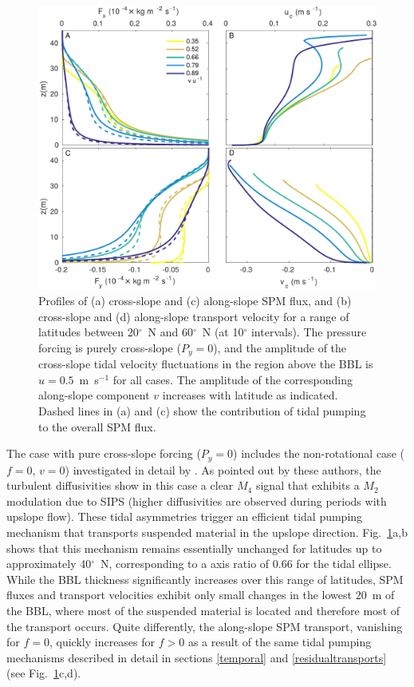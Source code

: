 \begin{figure}
  \noindent\includegraphics[width=30pc]{coriolis.pdf}
  \caption{Profiles of (a) cross-slope and (c) along-slope SPM flux,
    and (b) cross-slope and (d) along-slope transport velocity for a
    range of latitudes between 20$^\circ$~N and 60$^\circ$~N (at
    10$^\circ$ intervals).  The pressure forcing is purely cross-slope
    ($P_y=0$), and the amplitude of the cross-slope tidal velocity
    fluctuations in the region above the BBL is $u=0.5$~m~s$^{-1}$ for
    all cases. The amplitude of the corresponding along-slope
    component $v$ increases with latitude as indicated.  Dashed lines
    in (a) and (c) show the contribution of tidal pumping to the
    overall SPM flux.}
  \label{coriolis}
\end{figure}

The case with pure cross-slope forcing ($P_y=0$) includes the
non-rotational case ($f=0$, $v=0$) investigated in detail by
\cite{schulzumlauf2016}. As pointed out by these authors, the
turbulent diffusivities show in this case a clear $M_4$ signal that
exhibits a $M_2$ modulation due to SIPS (higher diffusivities are
observed during periods with upslope flow). These tidal asymmetries
trigger an efficient tidal pumping mechanism that transports suspended
material in the upslope direction. Fig.\ \ref{coriolis}a,b shows that
this mechanism remains essentially unchanged for latitudes up to
approximately 40$^\circ$~N, corresponding to a axis ratio of 0.66 for
the tidal ellipse. While the BBL thickness significantly increases
over this range of latitudes, SPM fluxes and transport velocities
exhibit only small changes in the lowest 20~m of the BBL, where most
of the suspended material is located and therefore most of the
transport occurs. Quite differently, the along-slope SPM transport,
vanishing for $f=0$, quickly increases for $f>0$ as a result of the
same tidal pumping mechanisms described in detail in sections
\ref{temporal} and \ref{residualtransports} (see
Fig.\ \ref{coriolis}c,d).

